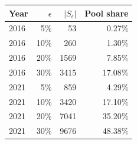 \begin{tabular}{@{}lrrr@{}}
\toprule
Year & $\epsilon$ & $|S_\epsilon|$ & Pool share \\
\midrule
2016 & 5\% & 53 & 0.27\% \\
2016 & 10\% & 260 & 1.30\% \\
2016 & 20\% & 1569 & 7.85\% \\
2016 & 30\% & 3415 & 17.08\% \\
2021 & 5\% & 859 & 4.29\% \\
2021 & 10\% & 3420 & 17.10\% \\
2021 & 20\% & 7041 & 35.20\% \\
2021 & 30\% & 9676 & 48.38\% \\
\bottomrule
\end{tabular}
